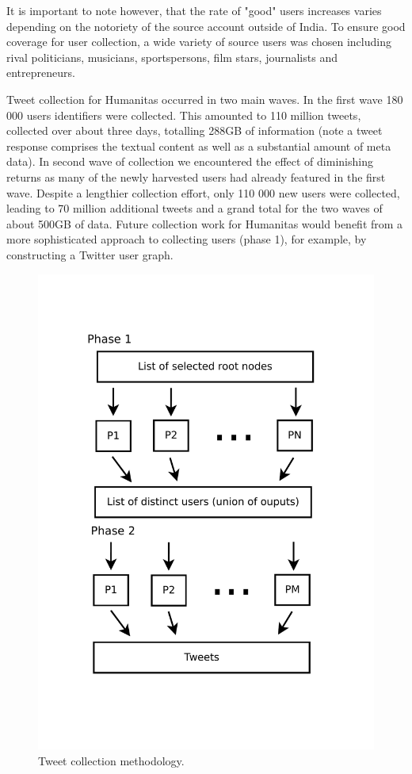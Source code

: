 It is important to note however, that the rate of "good" users increases varies depending on the notoriety of the source account outside of India. To ensure good coverage for user collection, a wide variety of source users was chosen including rival politicians, musicians, sportspersons, film stars, journalists and entrepreneurs.

Tweet collection for Humanitas occurred in two main waves. In the first wave 180 000 users identifiers were collected. This amounted to 110 million tweets, collected over about three days, totalling 288GB of information (note a tweet response comprises the textual content as well as a substantial amount of meta data). In second wave of collection we encountered the effect of diminishing returns as many of the newly harvested users had already featured in the first wave. Despite a lengthier collection effort, only 110 000 new users were collected, leading to 70 million additional tweets and a grand total for the two waves of about 500GB of data. Future collection work for Humanitas would benefit from a more sophisticated approach to collecting users (phase 1), for example, by constructing a Twitter user graph.

\begin{figure}
\includegraphics[width=.7\textwidth]{./img/CollectionProcess.pdf}
\caption{Tweet collection methodology.}
\label{fig:methodology}
\end{figure}

